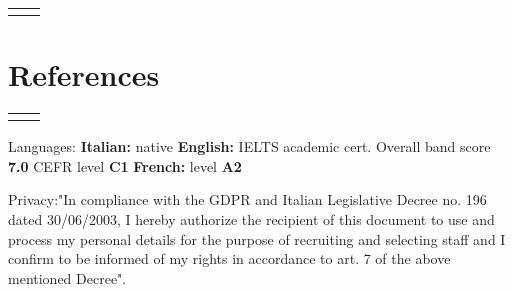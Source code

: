 \documentclass[
	10pt, %
]{../templates/FreemanCV}
\begin{document}
\begin{paracol}{2}
\begin{supertabular}{r l}

\end{supertabular}


\section{References}




\begin{supertabular}{r l} %
\end{supertabular}

\end{paracol} %

\textcolor{headings}{Languages:} \qquad \textbf{Italian:}  native \qquad
                                \textbf{English:}  IELTS academic cert. Overall band score \textbf{7.0} CEFR level \textbf{C1}\qquad
                                \textbf{French:} level \textbf{A2} 
\smallskip

\textcolor{headings}{Privacy:}\quad"In compliance with the GDPR and Italian Legislative Decree no. 196 dated 30/06/2003, I hereby authorize the recipient of this document to use and process my personal details for the purpose of recruiting and selecting staff and I confirm to be informed of my rights in accordance to art. 7 of the above mentioned Decree".
\end{document}
